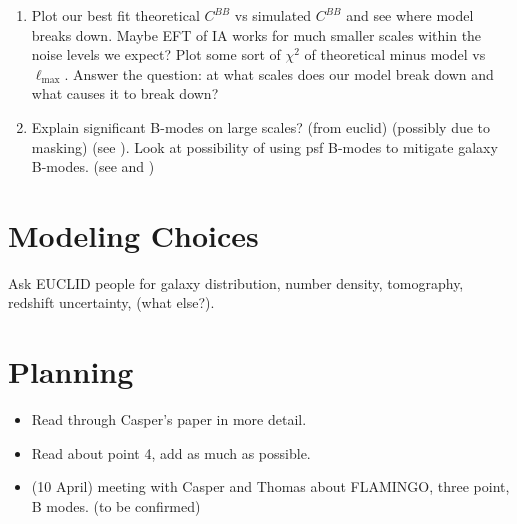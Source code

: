 \documentclass{article}
\begin{document}
\begin{enumerate}
\begin{enumerate}
        The $\Phi^4$ effects are given by:
        \begin{enumerate}
            \item multiple deflections (is this post born?) (causes B modes for sure)
            \item non-linear conversion of reduced shear to mean ellipticity
        \end{enumerate}
        \item Clarify change of \textit{observed} galaxy density due to magnification? 
    \end{enumerate}

    \item Plot our best fit theoretical $C^{BB}$ vs simulated $C^{BB}$ and see where model breaks down. Maybe EFT of IA works for much smaller scales within the noise levels we expect? Plot some sort of $\chi^2$ of theoretical minus model vs $\ell_{\text{max}}$. Answer the question: at what scales does our model break down and what causes it to break down?

    \item Explain significant B-modes on large scales? (from euclid) (possibly due to masking) (see \cite{Kitching2019}). Look at possibility of using psf B-modes to mitigate galaxy B-modes. (see \cite{2025OJAp....8E.139J} and \cite{2004MNRAS.347.1337H})
\end{enumerate}

\section*{Modeling Choices}
Ask EUCLID people for galaxy distribution, number density, tomography, redshift uncertainty, (what else?).

\section*{Planning}
\begin{itemize}
    \item Read through Casper's paper in more detail.
    \item Read about point 4, add as much as possible.
    \item (10 April) meeting with Casper and Thomas about FLAMINGO, three point, B modes. (to be confirmed)
\end{itemize}

\printbibliography
\end{document}

